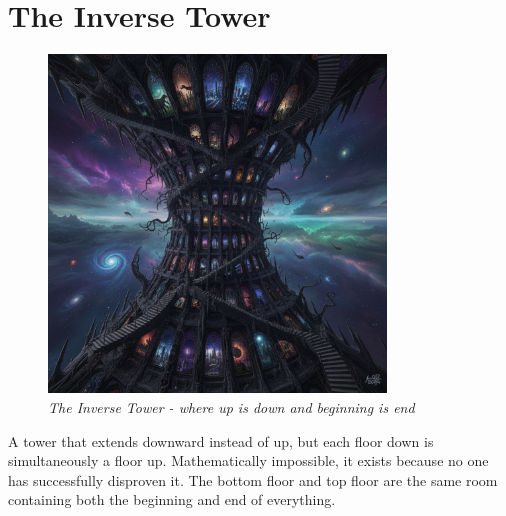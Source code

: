 \documentclass[11pt,a4paper,twoside]{book}
\begin{document}
\section{The Inverse Tower}

\begin{figure}[h]
\centering
\includegraphics[width=0.8\textwidth]{images/inverse_tower_2025-09-03T22-30-56-469Z_1.png}
\caption*{\textit{The Inverse Tower - where up is down and beginning is end}}
\end{figure}

\begin{center}
\end{center}

A tower that extends downward instead of up, but each floor down is simultaneously a floor up. Mathematically impossible, it exists because no one has successfully disproven it. The bottom floor and top floor are the same room containing both the beginning and end of everything.
\end{document}

